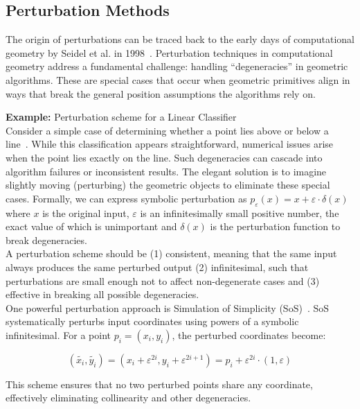 \documentclass[a4paper, oneside]{discothesis}
\begin{document}
\subsection{Perturbation Methods}

The origin of perturbations can be traced back to the early days of computational geometry by Seidel et al. in 1998~\cite{seidel1998nature}. Perturbation techniques in computational geometry address a fundamental challenge: handling ``degeneracies'' in geometric algorithms. These are special cases that occur when geometric primitives align in ways that break the general position assumptions the algorithms rely on.

\begin{highlightbox}
	\textbf{Example:} Perturbation scheme for a Linear Classifier \\

	Consider a simple case of determining whether a point lies above or below a line~\cite{de2000computational}. While this classification appears straightforward, numerical issues arise when the point lies exactly on the line. Such degeneracies can cascade into algorithm failures or inconsistent results. The elegant solution is to imagine slightly moving (perturbing) the geometric objects to eliminate these special cases. Formally, we can express symbolic perturbation as $p_\varepsilon(x) = x + \varepsilon \cdot \delta(x)$ where $x$ is the original input, $\varepsilon$ is an infinitesimally small positive number, the exact value of which is unimportant and $\delta(x)$ is the perturbation function to break degeneracies. \\

	A perturbation scheme should be (1) consistent, meaning that the same input always produces the same perturbed output (2) infinitesimal, such that perturbations are small enough not to affect non-degenerate cases and (3) effective in breaking all possible degeneracies. \\

	One powerful perturbation approach is Simulation of Simplicity (SoS)~\cite{franklin2022implementing, edelsbrunner2002topological, edelsbrunner2001sink, edelsbrunner1990simulation, levy2016robustness, schorn1993axiomatic}. SoS systematically perturbs input coordinates using powers of a symbolic infinitesimal. For a point $p_i = (x_i, y_i)$, the perturbed coordinates become:

	$$(\tilde{x_i}, \tilde{y_i}) = (x_i + \varepsilon^{2i}, y_i + \varepsilon^{2i+1}) = p_i + \varepsilon^{2i} \cdot (1, \varepsilon)$$

	This scheme ensures that no two perturbed points share any coordinate, effectively eliminating collinearity and other degeneracies.
\end{highlightbox}
\end{document}
